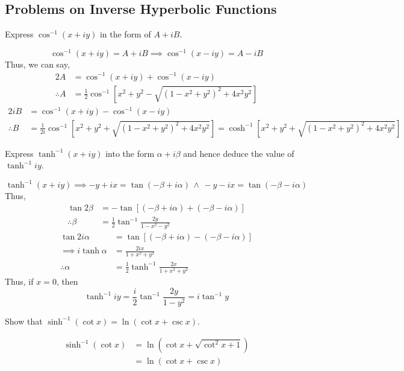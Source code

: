 \subsection{Problems on Inverse Hyperbolic Functions}
\begin{asign}
	Express $\cos^{-1}(x+iy)$ in the form of $A+iB$.
\end{asign}
\begin{anse}
	\[\cos^{-1}(x+iy)=A+iB\implies\cos^{-1}(x-iy)=A-iB\]
	Thus, we can say,
	\[\begin{split}
		2A&=\cos^{-1}(x+iy)+\cos^{-1}(x-iy)\\
		\therefore A&=\frac{1}{2}\cos^{-1}\left[x^2+y^2-\sqrt{(1-x^2+y^2)^2+4x^2y^2}\right]
	\end{split}\]
	\[\begin{split}
		2iB&=\cos^{-1}(x+iy)-\cos^{-1}(x-iy)\\
		\therefore B&=\frac{1}{2i}\cos^{-1}\left[x^2+y^2+\sqrt{(1-x^2+y^2)^2+4x^2y^2}\right]=\cosh^{-1}\left[x^2+y^2+\sqrt{(1-x^2+y^2)^2+4x^2y^2}\right]
	\end{split}\]
\end{anse}
\begin{asign}
	Express $\tanh^{-1}(x+iy)$ into the form $\alpha+i\beta$ and hence deduce the value of $\tanh^{-1}iy$.
\end{asign}
\begin{anse}
	\[\tanh^{-1}(x+iy)\implies -y+ix=\tan(-\beta+i\alpha) \, \land \, -y-ix=\tan(-\beta-i\alpha)\]
	Thus,
	\[\begin{split}
		\tan2\beta&=-\tan\left[(-\beta+i\alpha)+(-\beta-i\alpha)\right]\\
		\therefore \beta&=\frac{1}{2}\tan^{-1}\frac{2y}{1-x^2-y^2}
	\end{split}\]
	\[\begin{split}
		\tan2i\alpha&=\tan\left[(-\beta+i\alpha)-(-\beta-i\alpha)\right]\\
		\implies i\tanh\alpha&=\frac{2ix}{1+x^2+y^2}\\
		\therefore \alpha&=\frac{1}{2}\tanh^{-1}\frac{2x}{1+x^2+y^2}
	\end{split}\]
	Thus, if $x=0$, then
	\[\tanh^{-1}iy=\frac{i}{2}\tan^{-1}\frac{2y}{1-y^2}=i\tan^{-1}y\]
\end{anse}
\begin{asign}
	Show that $\sinh^{-1}(\cot x)=\ln(\cot x+\csc x)$.
\end{asign}
\begin{anse}
	\[\begin{split}
		\sinh^{-1}(\cot x)&=\ln(\cot x+\sqrt{\cot^2 x+1})\\
		&=\ln(\cot x+\csc x)
	\end{split}\]
\end{anse}
